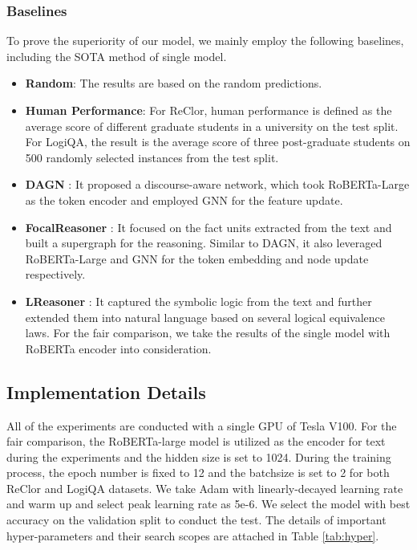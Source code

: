 \documentclass[sigconf]{acmart}
\begin{document}
\subsubsection{\textbf{Baselines}}
To prove the superiority of our model, we mainly employ the following baselines, including the SOTA method of single model. 

\begin{itemize}
	\item \textbf{Random}: The results are based on the random predictions.
	
	\item \textbf{Human Performance}\cite{yu2019reclor, liu2020logiqa}: For ReClor, human performance is defined as the average score of different graduate students in a university on the test split. For LogiQA, the result is the average score of three post-graduate students on 500 randomly selected instances from the test split.
	
	\item \textbf{DAGN} \cite{huang2021dagn}: It proposed a discourse-aware network, which took RoBERTa-Large\cite{liu2019roberta} as the token encoder and employed GNN for the feature update.
	
	\item \textbf{FocalReasoner} \cite{ouyang2021fact}: It focused on the fact units extracted from the text and built a supergraph for the reasoning. Similar to DAGN, it also leveraged RoBERTa-Large and GNN \cite{scarselli2008graph} for the token embedding and node update respectively.
	
	\item \textbf{LReasoner} \cite{wang2021logic}: It captured the symbolic logic from the text and further extended them into natural language based on several logical equivalence laws. For the fair comparison, we take the results of the single model with RoBERTa encoder into consideration.
\end{itemize}

\subsection{Implementation Details}
All of the experiments are conducted with a single GPU of Tesla V100. For the fair comparison, the RoBERTa-large model \cite{liu2019roberta} is utilized as the encoder for text during the experiments and the hidden size is set to 1024. During the training process, the epoch number is fixed to 12 and the batchsize is set to 2 for both ReClor and LogiQA datasets. We take Adam \cite{kingma2014adam} with linearly-decayed learning rate and warm up and select peak learning rate as 5e-6. We select the model with best accuracy on the validation split to conduct the test. The details of important hyper-parameters and their search scopes are attached in Table \ref{tab:hyper}.
\end{document}

